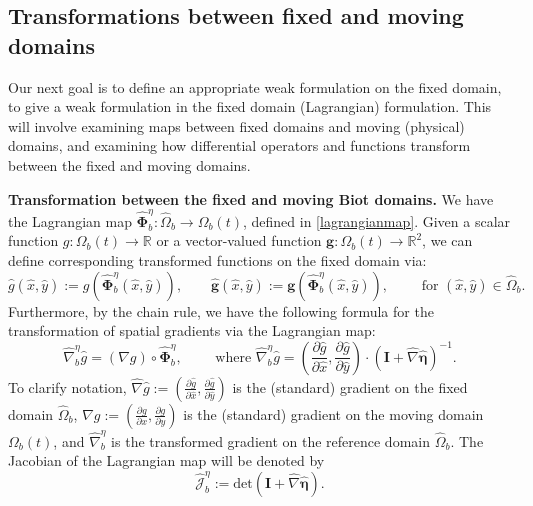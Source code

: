 \documentclass[11pt]{article}
\newcommand{\bd}{\boldsymbol}
\def\R{{\mathbb R}}
\theoremstyle{definition}
\begin{document}
\subsection{Transformations between fixed and moving domains}\label{transformed}

Our next goal is to define an appropriate weak formulation on the fixed domain, to give a weak formulation in the fixed domain (Lagrangian) formulation. This will involve examining maps between fixed domains and moving (physical) domains, and examining how differential operators and functions transform between the fixed and moving domains. 

\medskip

\noindent \textbf{Transformation between the fixed and moving Biot domains.} We have the Lagrangian map $\hat{\bd{\Phi}}^{\eta}_{b}: \hat{\Omega}_{b} \to \Omega_{b}(t)$, defined in \eqref{lagrangianmap}. Given a scalar function $g: \Omega_{b}(t) \to \R$ or a vector-valued function $\bd{g}: \Omega_{b}(t) \to \R^{2}$, we can define corresponding transformed functions on the fixed domain via:
\begin{equation}\label{hatbiot}
\hat{g}(\hat{x}, \hat{y}) := g(\hat{\bd{\Phi}}^{\eta}_{b}(\hat{x}, \hat{y})), \qquad \hat{\bd{g}}(\hat{x}, \hat{y}) := \bd{g}(\hat{\bd{\Phi}}^{\eta}_{b}(\hat{x}, \hat{y})), \qquad \text{ for } (\hat{x}, \hat{y}) \in \hat{\Omega}_{b}.
\end{equation}
Furthermore, by the chain rule, we have the following formula for the transformation of spatial gradients via the Lagrangian map:
\begin{equation}\label{etanabla}
\hat{\nabla}^{\eta}_{b}\hat{g} = (\nabla g) \circ \hat{\bd{\Phi}}^{\eta}_{b}, \qquad \text{ where } \hat{\nabla}^{\eta}_{b} \hat{g} = \left(\frac{\partial \hat{g}}{\partial \hat{x}}, \frac{\partial \hat{g}}{\partial \hat{y}}\right) \cdot (\bd{I} + \hat{\nabla} \hat{\bd{\eta}})^{-1}.
\end{equation}
To clarify notation, $\displaystyle \hat{\nabla} \hat{g} := \left(\frac{\partial \hat{g}}{\partial \hat{x}}, \frac{\partial \hat{g}}{\partial \hat{y}}\right)$ is the (standard) gradient on the fixed domain $\hat{\Omega}_{b}$, $\displaystyle \nabla g := \left(\frac{\partial g}{\partial x}, \frac{\partial g}{\partial y}\right)$ is the (standard) gradient on the moving domain $\Omega_{b}(t)$, and $\hat{\nabla}^{\eta}_{b}$ is the transformed gradient on the reference domain $\hat{\Omega}_{b}$. The Jacobian of the Lagrangian map will be denoted by
\begin{equation}\label{jeta}
\hat{\mathcal{J}}^{\eta}_{b} := \text{det}(\bd{I} + \hat{\nabla} \hat{\bd{\eta}}).
\end{equation}
\end{document}
